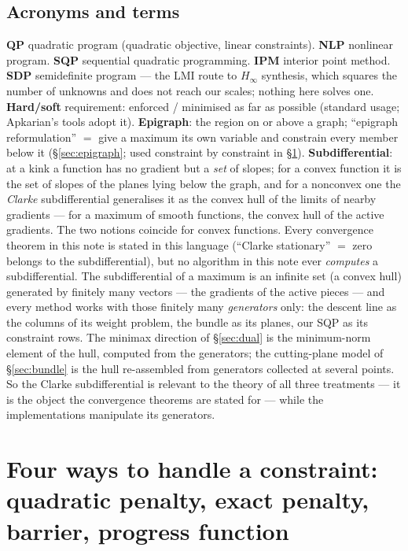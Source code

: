 \documentclass[11pt,a4paper]{article}
\newcommand{\rev}[1]{#1}
\newcommand{\revb}[1]{#1}
\begin{document}
\subsection{Acronyms and terms}
\textbf{QP} quadratic program (quadratic objective, linear constraints).  \textbf{NLP}
nonlinear program.  \textbf{SQP} sequential quadratic programming.  \textbf{IPM}
interior point method.  \textbf{SDP} semidefinite program --- the LMI route to $H_\infty$
synthesis, which squares the number of unknowns and does not reach our scales; nothing
here solves one.  \textbf{Hard/soft} requirement: enforced / minimised as far as
possible (standard usage; Apkarian's tools adopt it).  \textbf{Epigraph}: the region on
or above a graph; ``epigraph reformulation'' $=$ give a maximum its own variable and
constrain every member below it (\S\ref{sec:epigraph}; used constraint by constraint in
\S\ref{sec:penalty}).  \rev{\textbf{Subdifferential}: at a kink a function has no
gradient but a \emph{set} of slopes; for a convex function it is the set of slopes of
the planes lying below the graph, and for a nonconvex one the \emph{Clarke}
subdifferential generalises it as the convex hull of the limits of nearby gradients ---
for a maximum of smooth functions, the convex hull of the active gradients.  The two
notions coincide for convex functions.  Every convergence theorem in this note is stated
in this language (``Clarke stationary'' $=$ zero belongs to the subdifferential), \revb{but no algorithm in this note ever \emph{computes} a subdifferential.  The
subdifferential of a maximum is an infinite set (a convex hull) generated by finitely
many vectors --- the gradients of the active pieces --- and every method works with
those finitely many \emph{generators} only: the descent line as the columns of its
weight problem, the bundle as its planes, our SQP as its constraint rows.  The
minimax direction of \S\ref{sec:dual} is the minimum-norm element of the hull, computed
from the generators; the cutting-plane model of \S\ref{sec:bundle} is the hull
re-assembled from generators collected at several points.  So the Clarke subdifferential
is relevant to the theory of all three treatments --- it is the object the convergence
theorems are stated for --- while the implementations manipulate its generators.}}

\section{Four ways to handle a constraint: quadratic penalty, exact penalty, barrier, progress function}
\label{sec:penalty}
\end{document}
